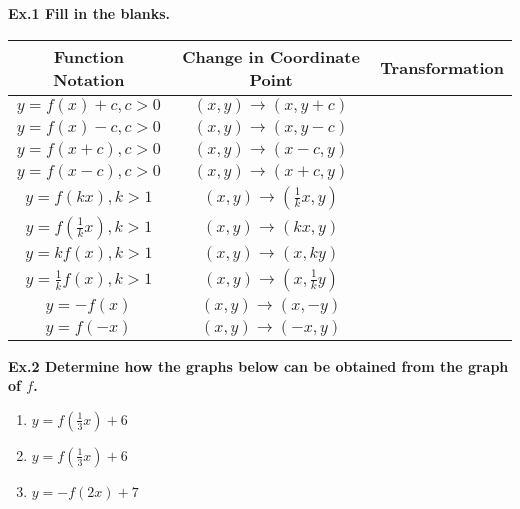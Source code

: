 \documentclass[Letterpaper, 12pt]{article}
\begin{document}
\noindent \textbf{Ex.1 Fill in the blanks.} \\
\begingroup
\setlength{\tabcolsep}{10pt} %
\renewcommand{\arraystretch}{1.5} %
\begin{table}[htbp]
	\centering
	\begin{tabular}{|c|c|c|}
		\hline
		Function Notation        & Change in Coordinate Point            & \hspace{1cm} Transformation \hspace{1cm} \\ [2ex] %
		\hline
		$y=f(x)+c, c>0$          & $(x, y) \rightarrow(x, y+c)$          &                                          \\ \hline
		$y=f(x)-c, c>0$          & $(x, y) \rightarrow(x, y-c)$          &                                          \\ \hline
		$y=f(x+c), c>0$          & $(x, y) \rightarrow(x-c, y)$          &                                          \\ \hline
		$y=f(x-c), c>0$          & $(x, y) \rightarrow(x+c, y)$          &                                          \\ \hline
		$y=f(kx), k>1$           & $(x, y) \rightarrow(\frac{1}{k}x, y)$ &                                          \\ \hline
		$y=f(\frac{1}{k}x), k>1$ & $(x, y) \rightarrow(kx, y)$           &                                          \\ \hline
		$y=kf(x), k>1$           & $(x, y) \rightarrow(x, ky)$           &                                          \\ \hline
		$y=\frac{1}{k}f(x), k>1$ & $(x, y) \rightarrow(x, \frac{1}{k}y)$ &                                          \\ \hline
		$y=-f(x)$                & $(x, y) \rightarrow(x, -y)$           & \hfill                                   \\ \hline
		$y=f(-x)$                & $(x, y) \rightarrow(-x, y)$           & \hfill                                   \\ \hline
	\end{tabular}
	\label{table:nonlin}
\end{table}
\endgroup

\noindent \textbf{Ex.2 Determine how the graphs below can be obtained from the graph of $f$.}

\begin{enumerate}[itemsep = 2\baselineskip]
	\item $y=f(\frac{1}{3} x) +6$
	      \vspace*{3\baselineskip}
	\item $y=f(\frac{1}{3} x) +6$
	\item $y=-f(2x)+7$
\end{enumerate}
\end{document}

